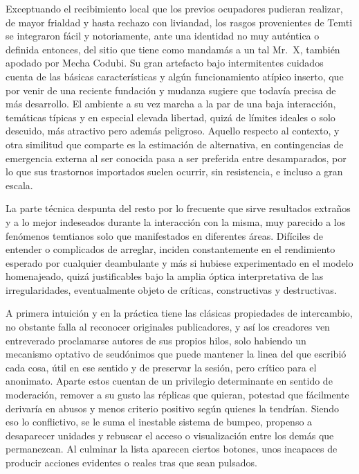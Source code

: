 \documentclass[
]{book}
\begin{document}
Exceptuando el recibimiento local que los previos ocupadores pudieran realizar, de mayor frialdad y hasta rechazo con liviandad, los rasgos provenientes de Temti se integraron fácil y notoriamente, ante una identidad no muy auténtica o definida entonces, del sitio que tiene como mandamás a un tal Mr.~X, también apodado por Mecha Codubi. Su gran artefacto bajo intermitentes cuidados cuenta de las básicas características y algún funcionamiento atípico inserto, que por venir de una reciente fundación y mudanza sugiere que todavía precisa de más desarrollo. El ambiente a su vez marcha a la par de una baja interacción, temáticas típicas y en especial elevada libertad, quizá de límites ideales o solo descuido, más atractivo pero además peligroso. Aquello respecto al contexto, y otra similitud que comparte es la estimación de alternativa, en contingencias de emergencia externa al ser conocida pasa a ser preferida entre desamparados, por lo que sus trastornos importados suelen ocurrir, sin resistencia, e incluso a gran escala.

La parte técnica despunta del resto por lo frecuente que sirve resultados extraños y a lo mejor indeseados durante la interacción con la misma, muy parecido a los fenómenos temtianos solo que manifestados en diferentes áreas. Difíciles de entender o complicados de arreglar, inciden constantemente en el rendimiento esperado por cualquier deambulante y más si hubiese experimentado en el modelo homenajeado, quizá justificables bajo la amplia óptica interpretativa de las irregularidades, eventualmente objeto de críticas, constructivas y destructivas.

A primera intuición y en la práctica tiene las clásicas propiedades de intercambio, no obstante falla al reconocer originales publicadores, y así los creadores ven entreverado proclamarse autores de sus propios hilos, solo habiendo un mecanismo optativo de seudónimos que puede mantener la linea del que escribió cada cosa, útil en ese sentido y de preservar la sesión, pero crítico para el anonimato. Aparte estos cuentan de un privilegio determinante en sentido de moderación, remover a su gusto las réplicas que quieran, potestad que fácilmente derivaría en abusos y menos criterio positivo según quienes la tendrían. Siendo eso lo conflictivo, se le suma el inestable sistema de bumpeo, propenso a desaparecer unidades y rebuscar el acceso o visualización entre los demás que permanezcan. Al culminar la lista aparecen ciertos botones, unos incapaces de producir acciones evidentes o reales tras que sean pulsados.
\end{document}
